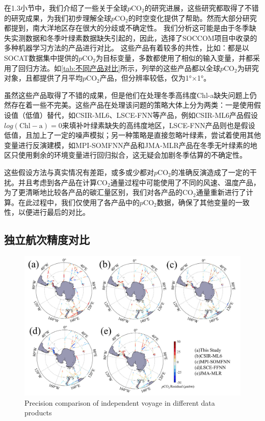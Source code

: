 在1.3小节中，我们介绍了一些关于全球$p\mathrm{CO_2}$的研究进展，这些研究都取得了不错的研究成果，为我们初步理解全球$p\mathrm{CO_2}$的时空变化提供了帮助。然而大部分研究都提到，南大洋地区存在很大的分歧或不确定性\cite{CSIR_ML6,MPI_SOMFFN,socat2016}。
我们分析这可能是由于冬季缺失实测数据和冬季叶绿素数据缺失引起的，因此，选择了SOCCOM项目中收录的多种机器学习方法的产品进行对比。
这些产品有着较多的共性，比如：都是以SOCAT数据集中提供的$p\mathrm{CO_2}$为目标变量，多数都使用了相似的输入变量，并都采用了回归方法。如\autoref{tab:不同产品对比}所示，列举的这些产品都以全球$p\mathrm{CO_2}$为研究对象，且都提供了月平均$p\mathrm{CO_2}$产品，但分辨率较低，仅为1°×1°。

虽然这些产品取得了不错的成果，但是他们在处理冬季高纬度Chl-a缺失问题上仍然存在着一些不完美。这些产品在处理该问题的策略大体上分为两类：一是使用假设值（低值）替代，如CSIR-ML6\cite{CSIR_ML6}、LSCE-FNN\cite{LSCE_FFNN}等产品，例如CSIR-ML6产品假设$log(\mathrm{Chl}-\mathrm{a})=0$来填补叶绿素缺失的高纬度地区，LSCE-FNN产品\cite{LSCE_FFNN}则也是假设低值，且加上了一定的噪声模拟；另一种策略是直接忽略叶绿素，尝试着使用其他变量进行反演建模，如MPI-SOMFNN产品\cite{MPI_SOMFFN}和JMA-MLR产品\cite{JMA_MLR}在冬季无叶绿素的地区只使用剩余的环境变量进行回归拟合，这无疑会加剧冬季估算的不确定性。

这些假设方法与真实情况有差距，或多或少都对$p\mathrm{CO_2}$的准确反演造成了一定的干扰。并且考虑到各产品在计算$\mathrm{CO_2}$通量过程中可能使用了不同的风速、温度产品，为了更清晰地比较各产品的碳汇量区别，我们对各产品的$\mathrm{CO_2}$通量重新进行了计算。在此过程中，我们仅使用了各产品中的$p\mathrm{CO_2}$数据，确保了其他变量的一致性，以便进行最后的对比。

\subsection{独立航次精度对比}
\begin{figure}[htbp]
    \centering
    \includegraphics[width=\linewidth]{figure/第四章用图/精度对比.jpg}
    {Precision comparison of independent voyage in different data products  }
\end{figure}

